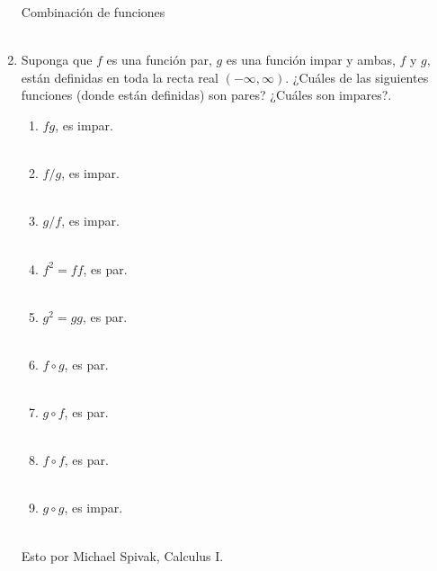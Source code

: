 \begin{enumerate}
Combinación de funciones\\\\

\item Suponga que $f$ es una función par, $g$ es una función impar y ambas, $f$ y $g$, están definidas en toda la recta real $(-\infty, \infty)$. ¿Cuáles de las siguientes funciones (donde están definidas) son pares? ¿Cuáles son impares?.
    \begin{enumerate}[\bfseries a)]

	\item $fg$, es impar.\\\\

	\item $f/g$, es impar.\\\\

	\item $g/f$, es impar.\\\\

	\item $f^2 = ff$, es par.\\\\

	\item $g^2 = gg$, es par.\\\\

	\item $f\circ g$, es par.\\\\

	\item $g\circ f$, es par.\\\\

	\item $f\circ f$, es par.\\\\

	\item $g\circ g$, es impar.\\\\

    \end{enumerate}
    Esto por Michael Spivak, Calculus I.\\\\


\end{enumerate}

